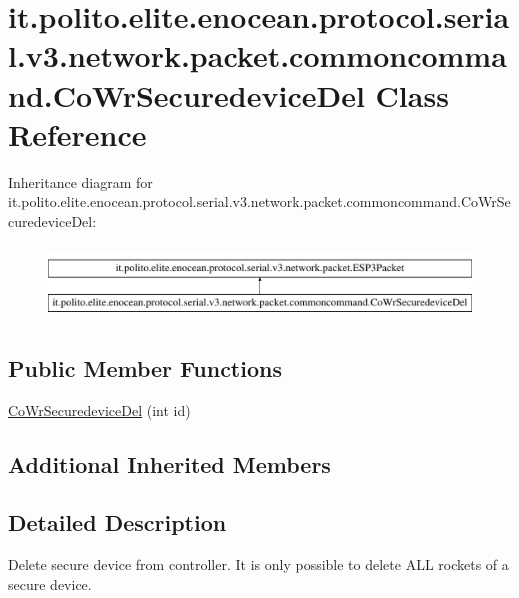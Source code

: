 \hypertarget{classit_1_1polito_1_1elite_1_1enocean_1_1protocol_1_1serial_1_1v3_1_1network_1_1packet_1_1common16165503087443ca110918c895f44b44}{}\section{it.\+polito.\+elite.\+enocean.\+protocol.\+serial.\+v3.\+network.\+packet.\+commoncommand.\+Co\+Wr\+Securedevice\+Del Class Reference}
\label{classit_1_1polito_1_1elite_1_1enocean_1_1protocol_1_1serial_1_1v3_1_1network_1_1packet_1_1common16165503087443ca110918c895f44b44}
Inheritance diagram for it.\+polito.\+elite.\+enocean.\+protocol.\+serial.\+v3.\+network.\+packet.\+commoncommand.\+Co\+Wr\+Securedevice\+Del\+:\begin{figure}[H]
\begin{center}
\leavevmode
\includegraphics[height=1.968366cm]{classit_1_1polito_1_1elite_1_1enocean_1_1protocol_1_1serial_1_1v3_1_1network_1_1packet_1_1common16165503087443ca110918c895f44b44}
\end{center}
\end{figure}
\subsection*{Public Member Functions}
\begin{DoxyCompactItemize}
\item 
\hyperlink{classit_1_1polito_1_1elite_1_1enocean_1_1protocol_1_1serial_1_1v3_1_1network_1_1packet_1_1common16165503087443ca110918c895f44b44_aa4bdba82d086c3fdfc8f2b09be7a07ca}{Co\+Wr\+Securedevice\+Del} (int id)
\end{DoxyCompactItemize}
\subsection*{Additional Inherited Members}


\subsection{Detailed Description}
Delete secure device from controller. It is only possible to delete A\+LL rockets of a secure device.

